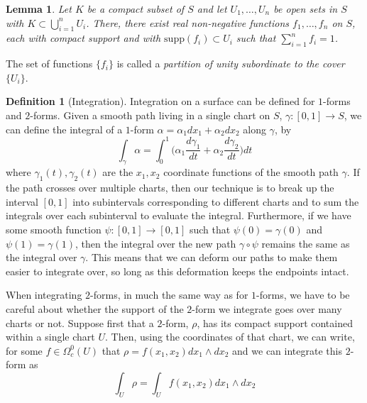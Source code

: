 \documentclass[11pt]{report}
\newtheorem{lemma}[thm]{Lemma}
\theoremstyle{definition}
\newtheorem{defn}[thm]{Definition}
\begin{document}
\begin{lemma}\cite[Lemma 7]{donaldson}
  Let $K$ be a compact subset of $S$ and let $U_1,\ldots,U_n$ be open sets in $S$ with $K \subset \bigcup\limits_{i=1}^n U_i$. There, there exist real non-negative functions $f_1,\ldots,f_n$ on $S$, each with compact support and with $\text{supp}(f_i) \subset U_i$ such that $\sum\limits_{i=1}^n f_i = 1$.
\end{lemma}
The set of functions $\{f_i\}$ is called a \emph{partition of unity subordinate to the cover $\{U_i\}$}.

\begin{defn}[Integration]\label{Integration}
  Integration on a surface can be defined for $1$-forms and $2$-forms. Given a smooth path living in a single chart on $S$, $\gamma \colon [0,1] \rightarrow S$, we can define the integral of a $1$-form $\alpha = \alpha_1 dx_1 + \alpha_2 dx_2$ along $\gamma$, by 
  \[\int_{\gamma}\alpha = \int_0^1\bigg(\alpha_1\frac{d\gamma_1}{dt}+\alpha_2\frac{d\gamma_2}{dt}\bigg) dt\] where $\gamma_1(t),\gamma_2(t)$ are the $x_1, x_2$ coordinate functions of the smooth path $\gamma$. If the path crosses over multiple charts, then our technique is to break up the interval $[0,1]$ into subintervals corresponding to different charts and to sum the integrals over each subinterval to evaluate the integral. Furthermore, if we have some smooth function $\psi \colon [0,1] \rightarrow [0,1]$ such that $\psi(0)=\gamma(0)$ and $\psi(1)=\gamma(1)$, then the integral over the new path $\gamma \circ \psi$ remains the same as the integral over $\gamma$. This means that we can deform our paths to make them easier to integrate over, so long as this deformation keeps the endpoints intact.

  When integrating $2$-forms, in much the same way as for $1$-forms, we have to be careful about whether the support of the $2$-form we integrate goes over many charts or not. Suppose first that a $2$-form, $\rho$, has its compact support contained within a single chart $U$. Then, using the coordinates of that chart, we can write, for some $f\in \Omega_c^0(U)$ that $\rho=f(x_1,x_2)dx_1\wedge dx_2$ and we can integrate this $2$-form as 
  \[\int_U \rho = \int_U f(x_1,x_2)dx_1\wedge dx_2\]
  

\end{defn}
\end{document}
